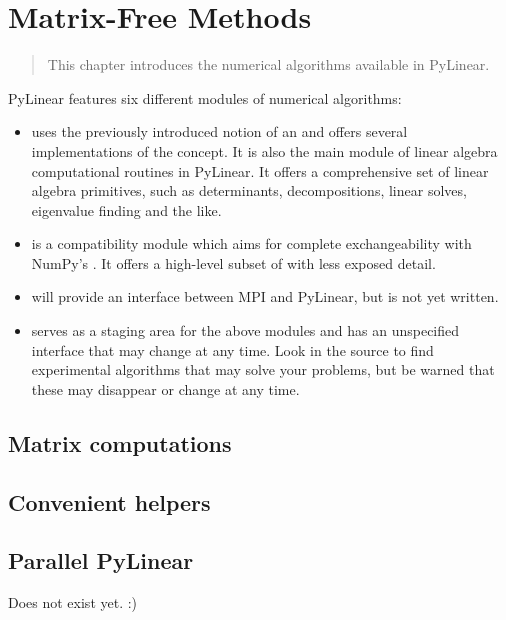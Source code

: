 \chapter{Matrix-Free Methods}
\label{cha:numerics}

\begin{quote}
   This chapter introduces the numerical algorithms available
   in PyLinear.
\end{quote}

PyLinear features six different modules of numerical algorithms:
\begin{itemize}
  \item {} uses the previously introduced 
    notion of an  and offers several implementations 
    of the concept. It is also the main module of linear
    algebra computational routines in PyLinear. It offers a
    comprehensive set of linear algebra primitives, such as
    determinants, decompositions, linear solves, eigenvalue finding
    and the like.
  \item {} is a compatibility module 
    which aims for complete exchangeability with NumPy's .
    It offers a high-level subset of  
    with less exposed detail.
  \item {} will provide an interface between
   MPI and PyLinear, but is not yet written.
  \item {} serves as a staging area for
    the above modules and has an unspecified interface that may 
    change at any time. Look in the source to find experimental
    algorithms that may solve your problems, but be warned that
    these may disappear or change at any time.
\end{itemize}

\section{Matrix computations}
\section{Convenient helpers}
\section{Parallel PyLinear}

Does not exist yet. :)
